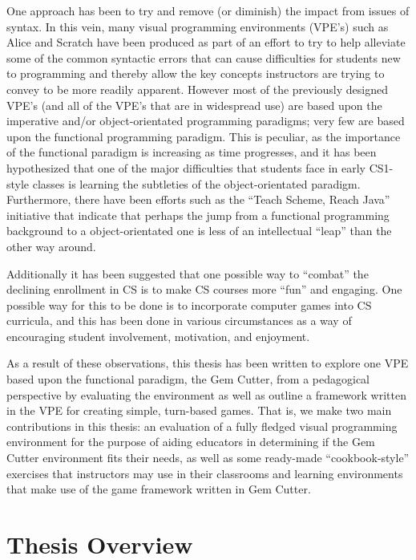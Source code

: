 One approach has been to try and remove (or diminish) the impact from issues of syntax.  In this vein, many visual programming environments (VPE's) such as Alice\cite{alice} and Scratch\cite{scratch} have been produced as part of an effort to try to help alleviate some of the common syntactic errors that can cause difficulties for students new to programming and thereby allow the key concepts instructors are trying to convey to be more readily apparent.  However most of the previously designed VPE's (and all of the VPE's that are in widespread use) are based upon the imperative and/or object-orientated programming paradigms; very few are based upon the functional programming paradigm.  This is peculiar, as the importance of the functional paradigm is increasing as time progresses, and it has been hypothesized that one of the major difficulties that students face in early CS1-style classes is learning the subtleties of the object-orientated paradigm\cite{Manaris07,Mahmoud04,Benander04}. Furthermore, there have been efforts such as the ``Teach Scheme, Reach Java'' initiative \cite{Bloch08,teachScheme,Felleisen04} that indicate that perhaps the jump from a functional programming background to a object-orientated one is less of an intellectual ``leap'' than the other way around\cite{Huch05}.

Additionally it has been suggested that one possible way to ``combat'' the declining enrollment in CS is to make CS courses more ``fun'' and engaging\cite{Carter06}.  One possible way for this to be done is to incorporate computer games into CS curricula, and this has been done in various circumstances as a way of encouraging student involvement, motivation, and enjoyment\cite{Barnes08,Gooch08,Curtis05,Overmars05,Sweedyk05}.

As a result of these observations, this thesis has been written to explore one VPE based upon the functional paradigm, the Gem Cutter, from a pedagogical perspective by evaluating the environment as well as outline a framework written in the VPE for creating simple, turn-based games.  That is, we make two main contributions in this thesis: an evaluation of a fully fledged visual programming environment for the purpose of aiding educators in determining if the Gem Cutter environment fits their needs, as well as some ready-made ``cookbook-style'' exercises that instructors may use in their classrooms and learning environments that make use of the game framework written in Gem Cutter.

\section{Thesis Overview}

